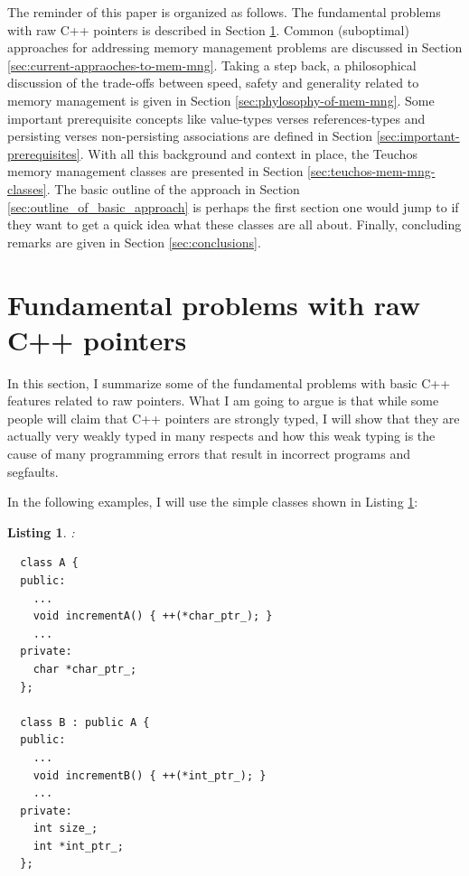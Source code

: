 \documentclass[pdf,ps2pdf,11pt]{SANDreport}
\newtheorem{listing}{Listing}
\begin{document}
The reminder of this paper is organized as follows. The fundamental
problems with raw C++ pointers is described in Section
{}\ref{sec:problems-with-raw-pointers}.  Common (suboptimal)
approaches for addressing memory management problems are discussed in
Section {}\ref{sec:current-appraoches-to-mem-mng}.  Taking a step
back, a philosophical discussion of the trade-offs between speed,
safety and generality related to memory management is given in Section
{}\ref{sec:phylosophy-of-mem-mng}.  Some important prerequisite
concepts like value-types verses references-types and persisting
verses non-persisting associations are defined in Section
{}\ref{sec:important-prerequisites}.  With all this background and context
in place, the Teuchos memory management classes are presented in
Section {}\ref{sec:teuchos-mem-mng-classes}.  The basic outline of the
approach in Section {}\ref{sec:outline_of_basic_approach} is perhaps
the first section one would jump to if they want to get a quick idea
what these classes are all about.  Finally, concluding remarks are
given in Section {}\ref{sec:conclusions}.


%
{}\section{Fundamental problems with raw C++ pointers}
\label{sec:problems-with-raw-pointers}
%

In this section, I summarize some of the fundamental problems with
basic C++ features related to raw pointers.  What I am going to argue
is that while some people will claim that C++ pointers are strongly
typed, I will show that they are actually very weakly typed in many
respects and how this weak typing is the cause of many programming
errors that result in incorrect programs and segfaults.

In the following examples, I will use the simple classes shown in
Listing {}\ref{listing:Simple_A_B}:

\begin{listing}:\\
\label{listing:Simple_A_B}
{\small\begin{verbatim}
  class A {
  public:
    ...
    void incrementA() { ++(*char_ptr_); }
    ...
  private:
    char *char_ptr_;
  };

  class B : public A {
  public:
    ...
    void incrementB() { ++(*int_ptr_); }
    ...
  private:
    int size_;
    int *int_ptr_;
  };
\end{verbatim}}
\end{listing}
\end{document}
